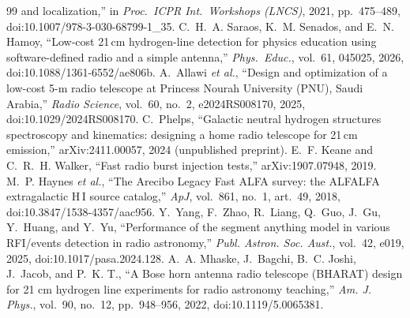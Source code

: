 \documentclass[journal]{IEEEtran}
\begin{document}
\begin{thebibliography}{99}
and localization,'' in \emph{Proc.~ICPR Int.\ Workshops (LNCS)}, 2021,
pp.~475--489, doi:10.1007/978-3-030-68799-1\_35.
 C.~H.~A. Saraos, K.~M. Senados, and E.~N. Hamoy,
``Low-cost 21\,cm hydrogen-line detection for physics education using
software-defined radio and a simple antenna,'' \emph{Phys.\ Educ.},
vol.~61, 045025, 2026, doi:10.1088/1361-6552/ae806b.
 A.~Allawi \emph{et al.}, ``Design and optimization of a
low-cost 5-m radio telescope at Princess Nourah University (PNU), Saudi
Arabia,'' \emph{Radio Science}, vol.~60, no.~2, e2024RS008170, 2025,
doi:10.1029/2024RS008170.
 C.~Phelps, ``Galactic neutral hydrogen structures
spectroscopy and kinematics: designing a home radio telescope for 21\,cm
emission,'' arXiv:2411.00057, 2024 (unpublished preprint).
 E.~F. Keane and C.~R.~H. Walker, ``Fast radio burst
injection tests,'' arXiv:1907.07948, 2019.
 M.~P. Haynes \emph{et al.}, ``The Arecibo Legacy Fast
ALFA survey: the ALFALFA extragalactic H\,I source catalog,''
\emph{ApJ}, vol.~861, no.~1, art.~49, 2018, doi:10.3847/1538-4357/aac956.
 Y.~Yang, F.~Zhao, R.~Liang, Q.~Guo, J.~Gu, Y.~Huang,
and Y.~Yu, ``Performance of the segment anything model in various
RFI/events detection in radio astronomy,'' \emph{Publ. Astron. Soc. Aust.},
vol.~42, e019, 2025, doi:10.1017/pasa.2024.128.
 A.~A. Mhaske, J.~Bagchi, B.~C. Joshi, J.~Jacob, and
P.~K. T., ``A Bose horn antenna radio telescope (BHARAT) design for 21 cm
hydrogen line experiments for radio astronomy teaching,''
\emph{Am. J. Phys.}, vol.~90, no.~12, pp.~948--956, 2022,
doi:10.1119/5.0065381.
\end{thebibliography}
\end{document}
